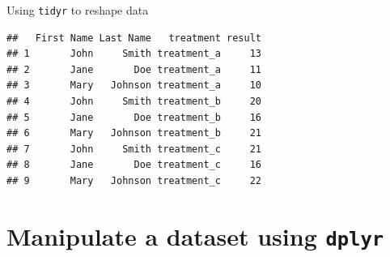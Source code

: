 \documentclass[14pt,ignorenonframetext,]{bredelebeamer}
\newenvironment{Shaded}{\begin{snugshade}}{\end{snugshade}}
\newcommand{\KeywordTok}[1]{\textcolor[rgb]{0.94,0.87,0.69}{#1}}
\newcommand{\DataTypeTok}[1]{\textcolor[rgb]{0.87,0.87,0.75}{#1}}
\newcommand{\DecValTok}[1]{\textcolor[rgb]{0.86,0.86,0.80}{#1}}
\newcommand{\StringTok}[1]{\textcolor[rgb]{0.80,0.58,0.58}{#1}}
\newcommand{\OperatorTok}[1]{\textcolor[rgb]{0.94,0.94,0.82}{#1}}
\newcommand{\NormalTok}[1]{\textcolor[rgb]{0.80,0.80,0.80}{#1}}
\begin{document}
\begin{frame}[fragile]{Using \texttt{tidyr} to reshape data}

\begin{Shaded}
\end{Shaded}

\begin{verbatim}
##   First Name Last Name   treatment result
## 1       John     Smith treatment_a     13
## 2       Jane       Doe treatment_a     11
## 3       Mary   Johnson treatment_a     10
## 4       John     Smith treatment_b     20
## 5       Jane       Doe treatment_b     16
## 6       Mary   Johnson treatment_b     21
## 7       John     Smith treatment_c     21
## 8       Jane       Doe treatment_c     16
## 9       Mary   Johnson treatment_c     22
\end{verbatim}

\end{frame}

\section{\texorpdfstring{Manipulate a dataset using
\texttt{dplyr}}{Manipulate a dataset using dplyr}}\label{manipulate-a-dataset-using-dplyr}
\end{document}
